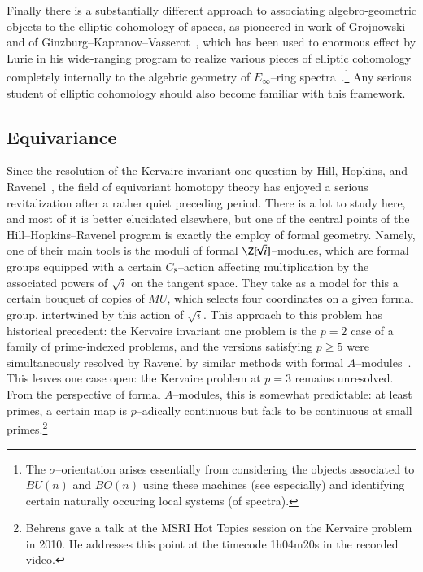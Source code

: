 Finally there is a substantially different approach to associating algebro-geometric objects to the elliptic cohomology of spaces, as pioneered in work of Grojnowski~\cite{Grojnowski} and of Ginzburg--Kapranov--Vasserot~\cite{GKV}, which has been used to enormous effect by Lurie in his wide-ranging program to realize various pieces of elliptic cohomology completely internally to the algebric geometry of $E_\infty$--ring spectra~\cite{LurieSurveyOfEll}.\footnote{The $\sigma$--orientation arises essentially from considering the objects associated to $BU(n)$ and $BO(n)$ using these machines (see \cite[Section 5.1]{LurieSurveyOfEll} especially) and identifying certain naturally occuring local systems (of spectra).}  Any serious student of elliptic cohomology should also become familiar with this framework.







\subsection*{Equivariance}

Since the resolution of the Kervaire invariant one question by Hill, Hopkins, and Ravenel~\cite{HHR}, the field of equivariant homotopy theory has enjoyed a serious revitalization after a rather quiet preceding period.  There is a lot to study here, and most of it is better elucidated elsewhere, but one of the central points of the Hill--Hopkins--Ravenel program is exactly the employ of formal geometry.  Namely, one of their main tools is the moduli of formal $\Z[\!\!\sqrt{i}]$--modules, which are formal groups equipped with a certain $C_8$--action affecting multiplication by the associated powers of $\!\!\sqrt{i}$ on the tangent space.  They take as a model for this a certain bouquet of copies of $MU$, which selects four coordinates on a given formal group, intertwined by this action of $\!\!\sqrt{i}$.  This approach to this problem has historical precedent: the Kervaire invariant one problem is the $p = 2$ case of a family of prime-indexed problems, and the versions satisfying $p \ge 5$ were simultaneously resolved by Ravenel by similar methods with formal $A$--modules~\cite{RavenelNonexistenceArfInvariantElts}.  This leaves one case open: the Kervaire problem at $p = 3$ remains unresolved.  From the perspective of formal $A$--modules, this is somewhat predictable: at least primes, a certain map is $p$--adically continuous but fails to be continuous at small primes.\footnote{Behrens gave a talk at the MSRI Hot Topics session on the Kervaire problem in 2010.  He addresses this point at the timecode 1h04m20s in the recorded video.}

